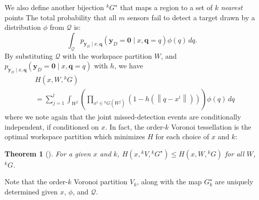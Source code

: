 \documentclass[letterpaper, 10 pt, conference]{ieeeconf}
\newtheorem{theorem}{Theorem}[section]
\newcommand{\Ram}[1]{{\normalsize{\textbf{({\color{green}Ram:\ }#1)}}}}
\newcommand{\HJ}[1]{{\color{black}{#1}}}
\begin{document}
We also define another bijection ${}^kG^{\star}$ that maps a region to a set of $k$ \emph{nearest} points \HJ{(out of $x$) to the region.} 
The total probability that all $m$ sensors fail to detect a target drawn by a distribution $\phi$ from $\mathcal{Q}$ is:
\begin{equation}
\int_{\mathcal{Q}} p_{\bm{y}_{D} \mid x,\bm{q}
}\left(\bm{y}_D = \mathbf{0} \mid x,\bm{q}=q
\right)\phi(q)\,{dq}.
\end{equation}
By substituting $\mathcal{Q}$ with the workspace partition $W$, and 
$p_{\bm{y}_{D} \mid x,\bm{q}
}\left(\bm{y}_D = \mathbf{0} \mid x,\bm{q}=q
\right)$
 with $h$, we have
\begin{align}
&H(x,W,{}^kG) \nonumber \\
&= \sum_{j = 1}^l \int_{W^j} \left( \prod_{x^i \in {}^kG(W^j)} \left(1- h \left(\left\|
q - x^i \right\|  \right) \right) \right)\phi(q)\,dq
\label{cost2}
\end{align}
where we note again that the joint missed-detection events are conditionally independent, if conditioned on $x$.
In fact, the order-$k$ Voronoi tessellation is the optimal workspace partition which minimizes $H$ for each choice of $x$ and $k$:
\begin{theorem}[\cite{park2014robust}]
	For a given $x$ and $k$,
	$
	H(x,{}^{k}V,{}^kG^{\star}) \leq H(x,W,{}^{k}G)
	$
	for all $W$, ${}^{k}G$.
\end{theorem}
\noindent Note that the order-$k$ Voronoi partition $V_k$, along with the map $G_k^{\star}$ are uniquely determined given $x$, $\phi$, and $\mathcal{Q}$. 
\end{document}
